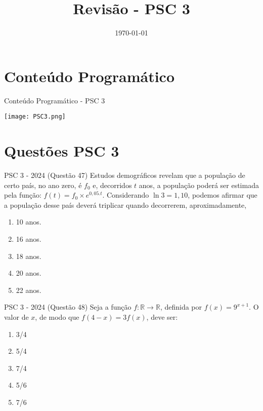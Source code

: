 \documentclass[aspectratio=169]{beamer}
\title[CETi Gilberto Mestrinho]{Revisão - PSC 3}
\date{\today}
\newif\ifusarcorvermelha
\newcommand{\vermelho}[1]{%
    \ifusarcorvermelha
        {\color{red}#1}%
    \else
        #1%
    \fi
}
\begin{document}
\justifying
\onehalfspacing


\begin{frame}
    \titlepage
\end{frame}

\section{Conteúdo Programático}

\begin{frame}{Conteúdo Programático - PSC 3}

    \begin{center}
        \texttt{[image: PSC3.png]}
    \end{center}
    
\end{frame}

\section{Questões PSC 3}

    \begin{frame}{PSC 3 - 2024 (Questão 47)}
        Estudos demográficos revelam que a população de certo país, no ano zero, é $f_{0}$ e, decorridos $t$ anos, a população poderá ser estimada pela função: $f(t)=f_{0} \times  e^{0,05 . t}$. Considerando $\ln{3}=1,10$, podemos afirmar que a população desse país deverá triplicar quando decorrerem, aproximadamente,

            \begin{enumerate}[a]
                \item 10 anos.
                \item 16 anos.
                \item 18 anos.
                \item 20 anos.
                \item \vermelho{22 anos.} %
            \end{enumerate}
            
    \end{frame}


    \begin{frame}{PSC 3 - 2024 (Questão 48)}
        Seja a função $f: \mathbb{R} \to \mathbb{R}$, definida por $f(x)=9^{x+1}$. O valor de $x$, de modo que $f(4-x)=3f(x)$, deve ser:
        
            \begin{enumerate}[a]
                \item {3}/{4}
                \item {5}/{4}
                \item \vermelho{{7}/{4}} %
                \item {5}/{6}
                \item {7}/{6}
            \end{enumerate}
            
    \end{frame}
\end{document}
